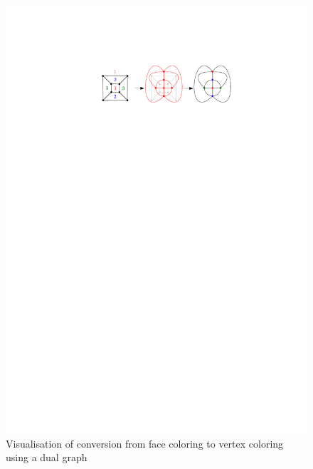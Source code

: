\begin{figure}[H]
    \centering
    \includegraphics[width=1\textwidth]{../Resources/Figs/cubical_dual_graph.pdf}
    \caption{Visualisation of conversion from face coloring to vertex coloring using a dual graph}
    \label{fig:cubical_dual_graph}
\end{figure}